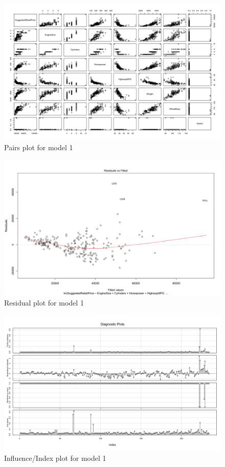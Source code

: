 \documentclass{article}
\begin{document}
\begin{figure}[h!]				
	\centering
	\includegraphics[width=16cm]{Part1_Pairs_Original}
	\caption{Pairs plot for model 1}
\end{figure}

\begin{figure}[h!]				
	\centering
	\includegraphics[width=16cm]{Part1_residuals}
	\caption{Residual plot for model 1}
\end{figure}

\begin{figure}[h!]				
	\centering
	\includegraphics[width=14cm]{Part1_influenceplot}
	\caption{Influence/Index plot for model 1}
\end{figure}
\end{document}
